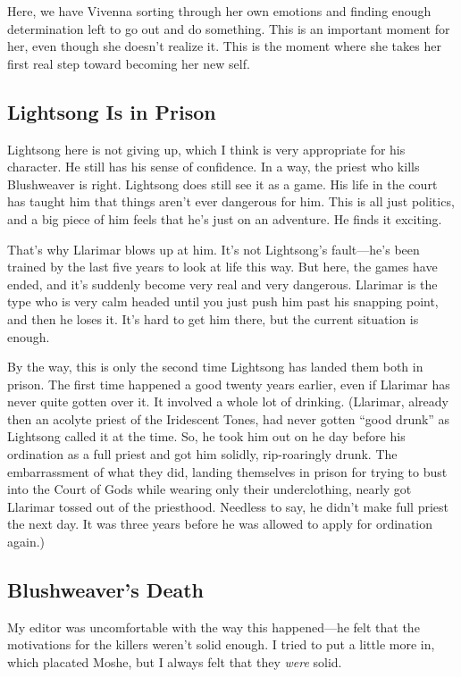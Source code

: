 Here, we have Vivenna sorting through her own emotions and finding enough determination left to go out and do something. This is an important moment for her, even though she doesn’t realize it. This is the moment where she takes her first real step toward becoming her new self.

\subsection*{Lightsong Is in Prison}

Lightsong here is not giving up, which I think is very appropriate for his character. He still has his sense of confidence. In a way, the priest who kills Blushweaver is right. Lightsong does still see it as a game. His life in the court has taught him that things aren’t ever dangerous for him. This is all just politics, and a big piece of him feels that he’s just on an adventure. He finds it exciting.

That’s why Llarimar blows up at him. It’s not Lightsong’s fault—he’s been trained by the last five years to look at life this way. But here, the games have ended, and it’s suddenly become very real and very dangerous. Llarimar is the type who is very calm headed until you just push him past his snapping point, and then he loses it. It’s hard to get him there, but the current situation is enough.

By the way, this is only the second time Lightsong has landed them both in prison. The first time happened a good twenty years earlier, even if Llarimar has never quite gotten over it. It involved a whole lot of drinking. (Llarimar, already then an acolyte priest of the Iridescent Tones, had never gotten “good drunk” as Lightsong called it at the time. So, he took him out on he day before his ordination as a full priest and got him solidly, rip-roaringly drunk. The embarrassment of what they did, landing themselves in prison for trying to bust into the Court of Gods while wearing only their underclothing, nearly got Llarimar tossed out of the priesthood. Needless to say, he didn’t make full priest the next day. It was three years before he was allowed to apply for ordination again.)

\subsection*{Blushweaver’s Death}

My editor was uncomfortable with the way this happened—he felt that the motivations for the killers weren’t solid enough. I tried to put a little more in, which placated Moshe, but I always felt that they \textit{were} solid.

